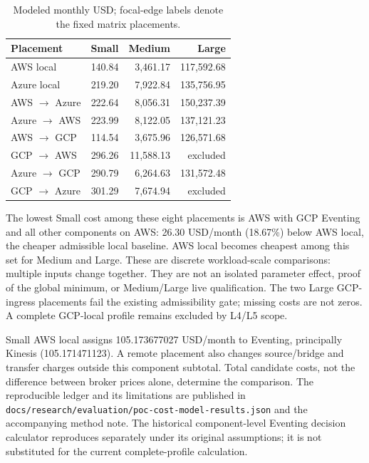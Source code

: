 \begin{table}[htbp]
\centering
\small
\caption{Modeled monthly USD; focal-edge labels denote the fixed matrix placements.}
\label{tab:modeled-costs}
\begin{tabular}{@{}lrrr@{}}
\toprule
Placement & Small & Medium & Large \\
\midrule
AWS local & 140.84 & 3,461.17 & 117,592.68 \\
Azure local & 219.20 & 7,922.84 & 135,756.95 \\
AWS $\rightarrow$ Azure & 222.64 & 8,056.31 & 150,237.39 \\
Azure $\rightarrow$ AWS & 223.99 & 8,122.05 & 137,121.23 \\
AWS $\rightarrow$ GCP & 114.54 & 3,675.96 & 126,571.68 \\
GCP $\rightarrow$ AWS & 296.26 & 11,588.13 & excluded \\
Azure $\rightarrow$ GCP & 290.79 & 6,264.63 & 131,572.48 \\
GCP $\rightarrow$ Azure & 301.29 & 7,674.94 & excluded \\
\bottomrule
\end{tabular}
\end{table}

The lowest Small cost among these eight placements is AWS with GCP Eventing
and all other components on AWS: 26.30 USD/month (18.67\%) below AWS local,
the cheaper admissible local baseline. AWS local becomes cheapest among this
set for Medium and Large. These are discrete workload-scale comparisons:
multiple inputs change together. They are not an isolated parameter effect,
proof of the global minimum, or Medium/Large live qualification. The two Large
GCP-ingress placements fail the existing admissibility gate; missing costs are
not zeros. A complete GCP-local profile remains excluded by L4/L5 scope.

Small AWS local assigns 105.173677027 USD/month to Eventing, principally
Kinesis (105.171471123). A remote placement also changes source/bridge and
transfer charges outside this component subtotal. Total candidate costs, not
the difference between broker prices alone, determine the comparison.
The reproducible ledger and its limitations are published in
\texttt{docs/research/evaluation/poc-cost-model-results.json} and the
accompanying method note. The historical component-level Eventing decision
calculator reproduces separately under its original assumptions; it is not
substituted for the current complete-profile calculation.

